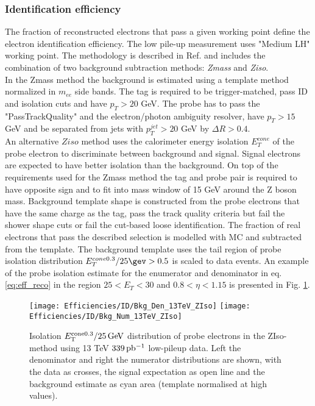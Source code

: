     \subsubsection{Identification efficiency}
    The fraction of reconstructed electrons that pass a given working point define the electron identification efficiency. The low pile-up \Wen measurement uses "Medium LH" working point. The methodology is described in Ref. \cite{electrons_reco1} and includes the combination of two background subtraction methods: \textit{Zmass} and \textit{Ziso}. \\
    In the Zmass method the background is estimated using a template method normalized in $m_{ee}$ side bands. The tag is required to be trigger-matched, pass ID and isolation cuts and have $p_T>20$ GeV. The probe has to pass the "PassTrackQuality" and the electron/photon ambiguity resolver, have $p_T>15$ GeV and be separated from jets with $p_T^{jet}>20$ GeV by $\Delta R>0.4$.\\
    An alternative $Ziso$ method uses the calorimeter energy isolation $E_T^{cone}$ of the probe electron to discriminate between background and signal. Signal electrons are expected to have better isolation than the background. On top of the requirements used for the Zmass method the tag and probe pair is required to have opposite sign and to fit into mass window of 15 GeV around the Z boson mass. Background template shape is constructed from the probe electrons that have the same charge as the tag, pass the track quality criteria but fail the shower shape cuts or fail the cut-based loose identification. The fraction of real electrons that pass the described selection is modelled with MC and subtracted from the template. The background template uses the tail region of probe isolation distribution $E_T^{cone0.3}/25\gev > 0.5$ is scaled to data events. An example of the probe isolation estimate for the enumerator and denominator in eq. \ref{eq:eff_reco} in the region $25<E_T<30$ and $0.8<\eta<1.15$ is presented in Fig. \ref{fig:bkgfit_ziso}.
    
    \begin{figure}[htbp]
    \centering
    \texttt{[image: Efficiencies/ID/Bkg\_Den\_13TeV\_ZIso]}
    \texttt{[image: Efficiencies/ID/Bkg\_Num\_13TeV\_ZIso]}
    \caption{Isolation $E_{\text{T}}^\mathrm{cone0.3}/25 \,\text{Ge\kern -0.1em V}$ distribution of
    	probe electrons in the ZIso-method using 13 TeV $339\,\mbox{pb\(^{-1}\)}$
    	low-pileup data. Left the denominator and right the numerator
    	distributions are shown, with the data as crosses, the signal \Zee
    	expectation as open line and the background estimate as cyan area
    	(template normalised at high values).}
    \label{fig:bkgfit_ziso}
    \end{figure} 
    
